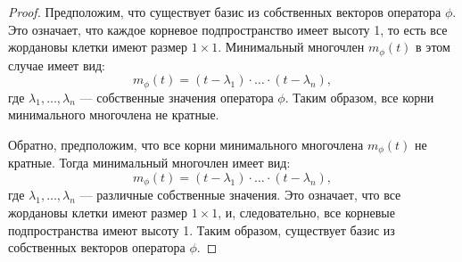 \begin{proof}
\leavevmode \nl 

    \boxed{\Rightarrow} Предположим, что существует базис из собственных векторов оператора $\phi$. Это означает, что каждое корневое подпространство имеет высоту 1, то есть все жордановы клетки имеют размер $1 \times 1$. Минимальный многочлен $m_{\phi}(t)$ в этом случае имеет вид:
    \[
    m_{\phi}(t) = (t - \lambda_1) \cdot \ldots \cdot (t - \lambda_n),
    \]
    где $\lambda_1, \ldots, \lambda_n$ — собственные значения оператора $\phi$. Таким образом, все корни минимального многочлена не кратные.

    \boxed{\Leftarrow} Обратно, предположим, что все корни минимального многочлена $m_{\phi}(t)$ не кратные. Тогда минимальный многочлен имеет вид:
    \[
    m_{\phi}(t) = (t - \lambda_1) \cdot \ldots \cdot (t - \lambda_n),
    \]
    где $\lambda_1, \ldots, \lambda_n$ — различные собственные значения. Это означает, что все жордановы клетки имеют размер $1 \times 1$, и, следовательно, все корневые подпространства имеют высоту 1. Таким образом, существует базис из собственных векторов оператора $\phi$.
\end{proof}